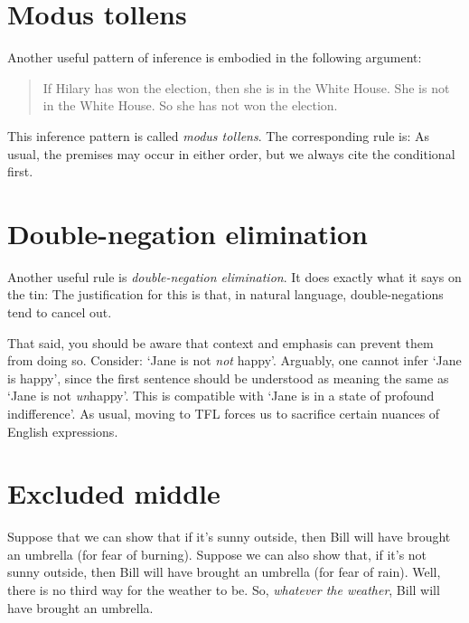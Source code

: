 \section{Modus tollens}
Another useful pattern of inference is embodied in the following argument:
	\begin{quote}
		If Hilary has won the election, then she is in the White House. She is not in the White House. So she has not won the election.
	\end{quote}
This inference pattern is called \emph{modus tollens}. The corresponding rule is:
As usual, the premises may occur in either order, but we always cite the conditional first.

\section{Double-negation elimination}
Another useful rule is \emph{double-negation elimination}. It does exactly what it says on the tin:
The justification for this is that, in natural language, double-negations tend to cancel out.

That said, you should be aware that context and emphasis can prevent them from doing so. Consider: `Jane is not \emph{not} happy'. Arguably, one cannot infer `Jane is happy', since the first sentence should be understood as meaning the same as  `Jane is not \emph{un}happy'. This is compatible with `Jane is in a state of profound indifference'. As usual, moving to TFL forces us to sacrifice certain nuances of English expressions.

\section{Excluded middle}

Suppose that we can show that if it's sunny outside, then Bill will have brought an umbrella (for fear of burning). Suppose we can also show that, if it's not sunny outside, then Bill will have brought an umbrella (for fear of rain). Well, there is no third way for the weather to be. So, \emph{whatever the weather}, Bill will have brought an umbrella.

